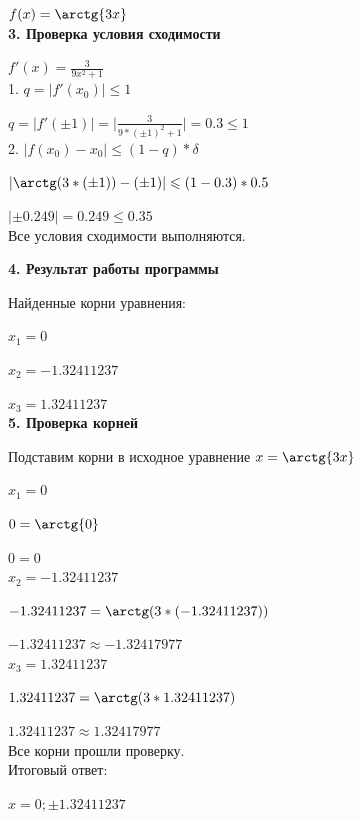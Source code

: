 \documentclass[oneside,final,14pt]{extreport}
\begin{document}
$f(x) = \arctg{3x}$\\


{\bfseries 3. Проверка условия сходимости}

$f'(x) = \frac{\displaystyle 3}{\displaystyle 9x^2 + 1}$\\

1. $q = \lvert f'(x_0) \rvert \leqslant 1$

\hspace{5.3mm}$q = \lvert f'(\pm 1) \rvert = \bigg | \frac{\displaystyle 3}{\displaystyle 9 * (\pm 1)^2 + 1} \bigg | = 0.3 \leqslant 1$\\

2. $\lvert f(x_0) - x_0 \rvert \leqslant (1 - q) * \delta$

\hspace{5.3mm}$\lvert \arctg(3 * (\pm 1)) - (\pm 1) \rvert \leqslant (1 - 0.3) * 0.5$

\hspace{5.3mm}$\lvert \pm 0.249 \rvert = 0.249 \leqslant 0.35$\\

Все условия сходимости выполняются.


{\bfseries 4. Результат работы программы}

Найденные корни уравнения:

$x_1 = 0$

$x_2 = -1.32411237$

$x_3 = 1.32411237$\\


{\bfseries 5. Проверка корней}

Подставим корни в исходное уравнение $x = \arctg{3x}$

$x_1 = 0$

$0 = \arctg{0}$

$0 = 0$\\

$x_2 = -1.32411237$

$-1.32411237 = \arctg(3 * (-1.32411237))$

$-1.32411237 \approx -1.32417977$\\

$x_3 = 1.32411237$

$1.32411237 = \arctg(3 * 1.32411237)$

$1.32411237 \approx 1.32417977$\\

Все корни прошли проверку.\\

Итоговый ответ:

$x = 0; \pm 1.32411237$
\end{document}
